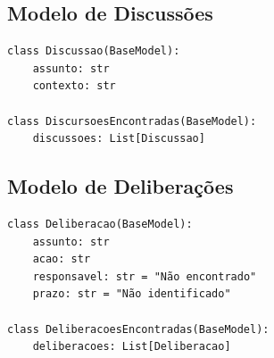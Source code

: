 \subsection*{Modelo de Discussões}

\begin{lstlisting}[caption={Modelo Pydantic para estruturação das discussões}]
class Discussao(BaseModel):
    assunto: str
    contexto: str

class DiscursoesEncontradas(BaseModel):
    discussoes: List[Discussao]
\end{lstlisting}


\subsection*{Modelo de Deliberações}

\begin{lstlisting}[caption={Modelo Pydantic para estruturação das deliberações}]
class Deliberacao(BaseModel):
    assunto: str
    acao: str
    responsavel: str = "Não encontrado"
    prazo: str = "Não identificado"

class DeliberacoesEncontradas(BaseModel):
    deliberacoes: List[Deliberacao]
\end{lstlisting}
